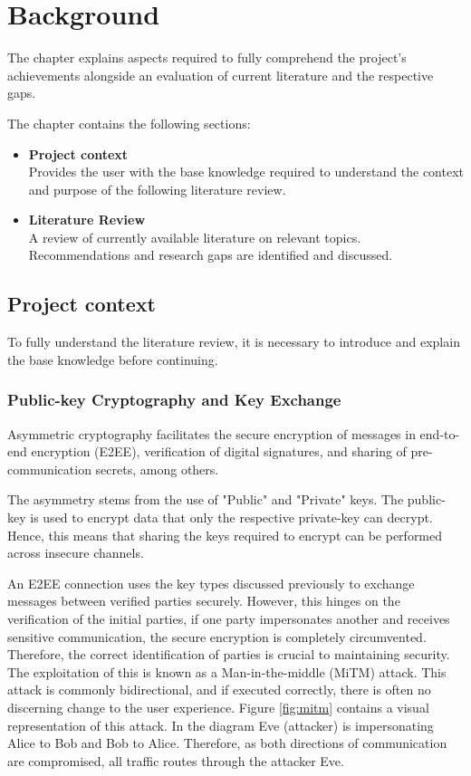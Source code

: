 \chapter{Background}
\label{cha:LiteratureReview}

The chapter explains aspects required to fully comprehend the project's achievements alongside an evaluation of current literature and the respective gaps.

The chapter contains the following sections:

\begin{itemize}
    \item \textbf{Project context} \\ 
    Provides the user with the base knowledge required to understand the context and purpose of the following literature review.
    
    \item \textbf{Literature Review} \\
    A review of currently available literature on relevant topics. Recommendations and research gaps are identified and discussed.

\end{itemize}

\section{Project context}

To fully understand the literature review, it is necessary to introduce and explain the base knowledge before continuing.

\subsection{Public-key Cryptography and Key Exchange}

Asymmetric cryptography facilitates the secure encryption of messages in end-to-end encryption (E2EE), verification of digital signatures, and sharing of pre-communication secrets, among others. 

The asymmetry stems from the use of "Public" and "Private" keys. The public-key is used to encrypt data that only the respective private-key can decrypt. Hence, this means that sharing the keys required to encrypt can be performed across insecure channels.

An E2EE connection uses the key types discussed previously to exchange messages between verified parties securely. However, this hinges on the verification of the initial parties, if one party impersonates another and receives sensitive communication, the secure encryption is completely circumvented. Therefore, the correct identification of parties is crucial to maintaining security. The exploitation of this is known as a Man-in-the-middle (MiTM) attack. This attack is commonly bidirectional, and if executed correctly, there is often no discerning change to the user experience. Figure \ref{fig:mitm} contains a visual representation of this attack. In the diagram Eve (attacker) is impersonating Alice to Bob and Bob to Alice. Therefore, as both directions of communication are compromised, all traffic routes through the attacker Eve.

